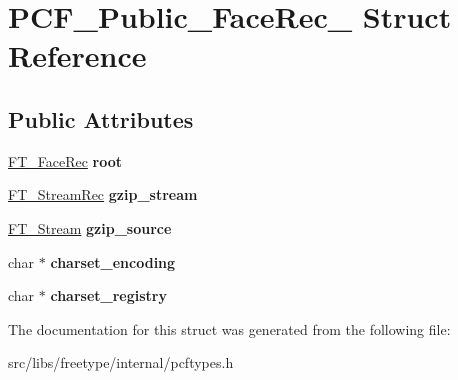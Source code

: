 \hypertarget{struct_p_c_f___public___face_rec__}{
\section{PCF\_\-Public\_\-FaceRec\_\- Struct Reference}
\label{struct_p_c_f___public___face_rec__}
}
\subsection*{Public Attributes}
\begin{DoxyCompactItemize}
\item 
\hypertarget{struct_p_c_f___public___face_rec___a1dbee8e6e08090c8da06cc120345fe48}{
\hyperlink{struct_f_t___face_rec__}{FT\_\-FaceRec} {\bfseries root}}
\label{struct_p_c_f___public___face_rec___a1dbee8e6e08090c8da06cc120345fe48}

\item 
\hypertarget{struct_p_c_f___public___face_rec___a75244245ee75dba29df2d2f50f95832d}{
\hyperlink{struct_f_t___stream_rec__}{FT\_\-StreamRec} {\bfseries gzip\_\-stream}}
\label{struct_p_c_f___public___face_rec___a75244245ee75dba29df2d2f50f95832d}

\item 
\hypertarget{struct_p_c_f___public___face_rec___af15a1b3782e27e24dabfaf7a4377d254}{
\hyperlink{struct_f_t___stream_rec__}{FT\_\-Stream} {\bfseries gzip\_\-source}}
\label{struct_p_c_f___public___face_rec___af15a1b3782e27e24dabfaf7a4377d254}

\item 
\hypertarget{struct_p_c_f___public___face_rec___a4e4418ca9195fb5ffeffe3b5a1673fb6}{
char $\ast$ {\bfseries charset\_\-encoding}}
\label{struct_p_c_f___public___face_rec___a4e4418ca9195fb5ffeffe3b5a1673fb6}

\item 
\hypertarget{struct_p_c_f___public___face_rec___ae52cd53a5df958c75658372827679373}{
char $\ast$ {\bfseries charset\_\-registry}}
\label{struct_p_c_f___public___face_rec___ae52cd53a5df958c75658372827679373}

\end{DoxyCompactItemize}


The documentation for this struct was generated from the following file:\begin{DoxyCompactItemize}
\item 
src/libs/freetype/internal/pcftypes.h\end{DoxyCompactItemize}
